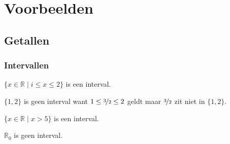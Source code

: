 \documentclass[main.tex]{subfiles}
\begin{document}
\chapter{Voorbeelden}
\label{cha:voorbeelden}


\section{Getallen}

\subsection{Intervallen}
\begin{vb}
  $\{x\in \mathbb{R} \mid i \le x \le 2\}$ is een interval.
\end{vb}

\begin{vb}
  $\{1,2\}$ is geen interval want $1 \le \nicefrac{3}{2} \le 2$ geldt maar $\nicefrac{3}{2}$ zit niet in $\{1,2\}$.  
\end{vb}

\begin{vb}
  $\{x\in \mathbb{R} \mid x > 5\}$ is een interval.
\end{vb}

\begin{vb}
  $\mathbb{R}_{0}$ is geen interval.
\end{vb}
\end{document}
